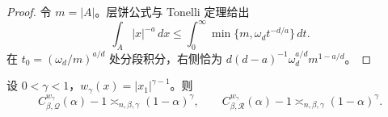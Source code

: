 \begin{proof}
令 \(m=|A|\)。层饼公式与 Tonelli 定理给出
\[
 \int_A|x|^{-a}\,dx
 \leq\int_0^\infty\min\{m,\omega_dt^{-d/a}\}\,dt.
\]
在 \(t_0=(\omega_d/m)^{a/d}\) 处分段积分，右侧恰为
\(d(d-a)^{-1}\omega_d^{a/d}m^{1-a/d}\)。
\end{proof}

\begin{proposition}[一坐标奇性权的非中心阶]\label{wgt:proposition-one-coordinate}
设 \(0<\gamma<1\)，\(w_\gamma(x)=|x_1|^{\gamma-1}\)。则
\begin{equation}
 C^{w_\gamma}_{\beta,\mathcal Q}(\alpha)-1\asymp_{n,\beta,\gamma}(1-\alpha)^\gamma,
 \qquad
 C^{w_\gamma}_{\beta,\mathcal R}(\alpha)-1\asymp_{n,\beta,\gamma}(1-\alpha)^\gamma.
\label{wgt:one-coordinate}
\end{equation}
\end{proposition}

